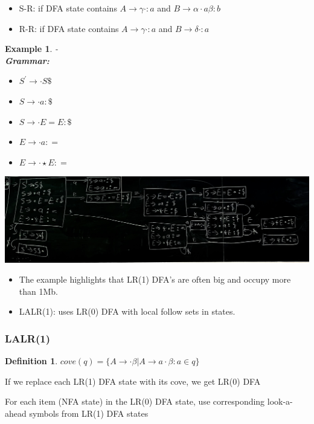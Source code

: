 \documentclass{article}
\newtheorem{ex}[theorem]{Example}
\newtheorem{definition}[theorem]{Definition}
\newenvironment{exblock}[1]{%
    \tcolorbox[beamer,%
    noparskip,breakable,
    colback=lightgreen,colframe=darkgreen,%
    colbacklower=limegreen!75!lightgreen,%
    title=#1]}%
    {\endtcolorbox}
\newenvironment{cblock}[1]{%
    \tcolorbox[beamer,%
    noparskip,breakable,
    colback=lightblue,colframe=darkblue,%
    colbacklower=darkblue!75!lightblue,%
    title=#1]}%
    {\endtcolorbox}
\begin{document}
 \begin{itemize}
 \item S-R: if DFA state contains \(A \rightarrow \gamma \cdot : a \) and \(B \rightarrow \alpha \cdot a \beta : b \)
 \item R-R: if DFA state contains \(A \rightarrow \gamma \cdot : a\) and \(B \rightarrow \delta \cdot : a \)
 \end{itemize}
 \begin{ex}-\\
 \textbf{Grammar:}
 \begin{itemize}
 \item \(S^ \prime \rightarrow \cdot S \$\)
 \item \(S \rightarrow \cdot a : \$\)
 \item \(S \rightarrow \cdot E = E : \$\)
 \item \(E \rightarrow \cdot a : = \)
 \item \(E \rightarrow \cdot \star E : = \)
 \end{itemize}
 \begin{center}
 \includegraphics[scale=0.15]{10}
 \end{center}
 \end{ex}
 
 \begin{itemize}
 \item The example highlights that LR(1) DFA's are often big and occupy more than 1Mb. 
 \item LALR(1): uses LR(0) DFA with local follow sets in states. 
 \end{itemize}

\subsubsection{LALR(1)}
\begin{definition} 
\(cove(q) = \{ A \rightarrow \cdot \beta | A \rightarrow a \cdot \beta : a \in q\}\) 
\end{definition}

\begin{exblock}{Fact}
If we replace each LR(1) DFA state with its cove, we get LR(0) DFA
\end{exblock}

\begin{cblock}{Idea}
For each item (NFA  state) in the LR(0) DFA state, use corresponding look-a-ahead symbols from LR(1) DFA states
\end{cblock}
\end{document}
